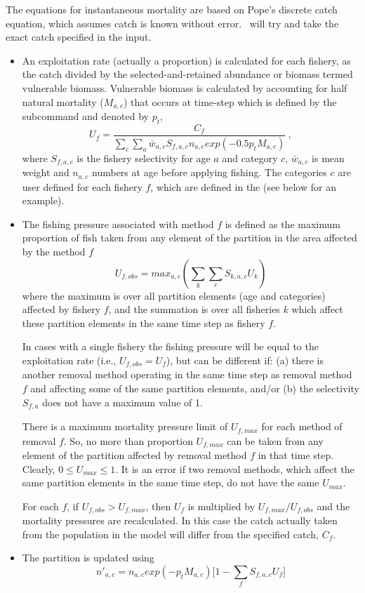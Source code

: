 The equations for instantaneous mortality are based on Pope's discrete catch equation, which assumes catch is known without error. \CNAME\ will try and take the exact catch specified in the input.

\begin{itemize}
	\item An exploitation rate (actually a proportion) is calculated for each fishery, as the catch divided by the selected-and-retained abundance or biomass termed vulnerable biomass. Vulnerable biomass is calculated by accounting for half natural mortality (\(M_{a,c}\)) that occurs at time-step which is defined by the subcommand  and denoted by \(p_t\),
	$$U_{f} = \frac{C_f}{\sum\limits_{c}\sum\limits_a \bar{w}_{a,c} S_{f,a,c} n_{a,c} exp(-0.5 p_t M_{a,c})} \ ,$$
	where \(S_{f,a,c}\) is the fishery selectivity for age \(a\) and category \(c\), \(\bar{w}_{a,c}\) is mean weight and \(n_{a,c}\) numbers at age before applying fishing. The categories \(c\) are user defined for each fishery \(f\), which are defined in the  (see below for an example).
	\item The fishing pressure associated with method $f$ is defined as the maximum proportion of fish taken from any element of the partition in the area affected by the method $f$
	$$ U_{f,obs} = max_{a,c}(\sum\limits_k\sum\limits_c S_{k,a,c} U_k) $$
	where the maximum is over all partition elements (age and categories) affected by fishery $f$, and the summation is over all fisheries $k$ which affect these partition elements in the same time step as fishery $f$.

	In cases with a single fishery the fishing pressure will be equal to the exploitation rate (i.e., $U_{f,obs} = U_f$), but can be different if: (a) there is another removal method operating in the same time step as removal method $f$ and affecting some of the same partition elements, and/or (b) the selectivity $S_{f,a}$ does not have a maximum value of 1.

	There is a maximum mortality pressure limit of $U_{f,max}$ for each method of removal $f$. So, no more than proportion $U_{f,max}$ can be taken from any element of the partition affected by removal method $f$ in that time step. Clearly, $0 \leq U_{max} \leq 1$. It is an error if two removal methods, which affect the same partition elements in the same time step, do not have the same $U_{max}$.

	For each $f$, if $U_{f,obs} > U_{f,max}$, then $U_f$ is multiplied by $U_{f,max}/U_{f,obs}$ and the mortality pressures are recalculated. In this case the catch actually taken from the population in the model will differ from the specified catch, $C_f$.

	\item The partition is updated using
		$$ n'_{a,c} = n_{a,c} exp(-p_t M_{a,c})\big[1 - \sum_f S_{f,a,c} U_{f} \big] $$
\end{itemize}

